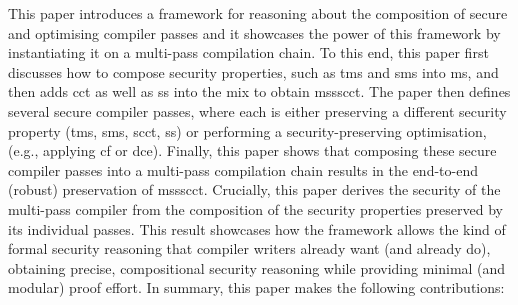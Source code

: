 \documentclass[dvipsnames,conference]{IEEEtran}
\theoremstyle{definition}
\begin{document}
This paper introduces a framework for reasoning about the composition of secure and optimising compiler passes %
and it showcases the power of this framework by instantiating it on a multi-pass compilation chain.
To this end, this paper first discusses how to compose security properties, such as \gls*{tms} and \gls*{sms} into \gls*{ms}, and then adds \gls*{cct} as well as \gls*{ss} into the mix to obtain \gls*{mssscct}.
The paper then defines several secure compiler passes, where each is either preserving a different security property (\gls*{tms}, \gls*{sms}, \gls*{scct}, \gls*{ss}) or performing a security-preserving optimisation, (e.g., applying \gls*{cf} or \gls*{dce}).
Finally, this paper shows that composing these secure compiler passes into a multi-pass compilation chain results in the end-to-end (robust) preservation of \gls*{mssscct}.
Crucially, this paper derives the security of the multi-pass compiler from the composition of the security properties preserved by its individual passes.
This result showcases how the framework allows the kind of formal security reasoning that compiler writers already want (and already do), obtaining precise, compositional security reasoning while providing minimal (and modular) proof effort.
%
In summary, this paper makes the following contributions:
\end{document}
